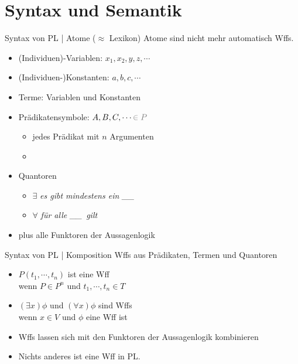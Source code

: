 \section{Syntax und Semantik}

\begin{frame}
  {Syntax von PL | Atome ($\approx$ Lexikon)}
  \onslide<+->
  \onslide<+->
  Atome sind nicht mehr automatisch Wffs.\\
  \Halbzeile
  \begin{itemize}[<+->]
    \item \alert{(Individuen)-Variablen}: $x_1, x_2, y, z, \cdots$ 
    \item \alert{(Individuen-)Konstanten}: $a, b, c, \cdots$ 
    \item \alert{Terme}: Variablen und Konstanten 
    \item \alert{Prädikatensymbole}: $A, B, C, \cdots \grau{\in P}$
      \begin{itemize}[<+->]
        \item jedes Prädikat mit $n$ Argumenten 
        \item {}
      \end{itemize}
    \item \alert{Quantoren}
      \begin{itemize}[<+->]
        \item $\exists$ \textit{es gibt mindestens ein \_\_}
        \item $\forall$ \textit{für alle \_\_\ gilt}
      \end{itemize}
    \item plus alle \alert{Funktoren} der Aussagenlogik
  \end{itemize}
\end{frame}

\begin{frame}
  {Syntax von PL | Komposition}
  \onslide<+->
  \onslide<+->
  Wffs aus Prädikaten, Termen und Quantoren\\
  \Halbzeile
  \begin{itemize}[<+->]
    \item \alert{$P(t_1,\cdots,t_n)$} ist eine Wff\\
      wenn \alert{$P\in P^n$} und \alert{$t_1,\cdots,t_n\in T$}
      \Halbzeile
    \item \alert{$(\exists x)\phi$} und \alert{$(\forall x)\phi$} sind Wffs\\
      wenn \alert{$x\in V$} und \alert{$\phi$ eine Wff} ist
      \Halbzeile
    \item Wffs lassen sich mit den Funktoren der Aussagenlogik kombinieren
      \Halbzeile
    \item Nichts anderes ist eine Wff in PL.\\
  \end{itemize}
\end{frame}

